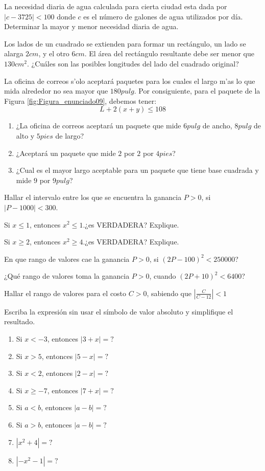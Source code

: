 \documentclass[]{book}
\theoremstyle{definition}
\theoremstyle{definition}
\theoremstyle{definition}
\theoremstyle{remark}
\begin{document}
La necesidad diaria de agua calculada para cierta ciudad esta dada por \(\left|c-3725\right|<100\) donde \(c\) es el número de galones de agua utilizados por día. Determinar la mayor y menor necesidad diaria de agua.

Los lados de un cuadrado se extienden para formar un rectángulo, un lado se alarga \(2cm\), y el otro \(6cm\). El área del rectángulo resultante debe ser menor que \(130cm^2\). ¿Cuáles son las posibles longitudes del lado del cuadrado original?

La oficina de correos s'olo aceptará paquetes para los cuales el largo m'as lo que mida alrededor no sea mayor que \(180 pulg\). Por consiguiente, para el paquete de la Figura \ref{fig:Figura_enunciado09}, debemos tener:
\[L+2(x+y)\leq 108\]

\begin{enumerate}
	\item ¿La oficina de correos aceptará un paquete que mide $6 pulg$ de ancho, $8 pulg$ de alto y $5 pies$ de largo?
	\item ¿Aceptar\'a un paquete que mide $2$ por $2$ por $4 pies$?
	\item ¿Cual es el mayor largo aceptable para un paquete que tiene base cuadrada y mide $9$ por $9 pulg$?
\end{enumerate}

Hallar el intervalo entre los que se encuentra la ganancia \(P>0\), si \(\left|P-1000\right|<300\).

Si \(x\leq 1\), entonces \(x^2\leq 1\).¿es VERDADERA? Explique.

Si \(x\geq 2\), entonces \(x^2\geq 4\).¿es VERDADERA? Explique.

En que rango de valores cae la ganancia \(P>0\), si \((2P-100)^2<250000\)?

¿Qué rango de valores toma la ganancia \(P>0\), cuando \((2P+10)^2<6400\)?

Hallar el rango de valores para el costo \(C>0\), sabiendo que \(\left|\frac{C}{C-12}\right|<1\)

Escriba la expresión sin usar el símbolo de valor absoluto y simplifique el resultado.

\begin{enumerate}
	\item Si $x<-3$, entonces $\left|3+x\right|=?$
	\item Si $x>5$, entonces $\left|5-x\right|=?$
	\item Si $x<2$, entonces $\left|2-x\right|=?$
	\item Si $x\geq -7$, entonces $\left|7+x\right|=?$
	\item Si $a<b$, entonces $\left|a-b\right|=?$
	\item Si $a>b$, entonces $\left|a-b\right|=?$
	\item $\left|x^2+4\right|=?$
	\item $\left|-x^2-1\right|=?$
\end{enumerate}
\end{document}
